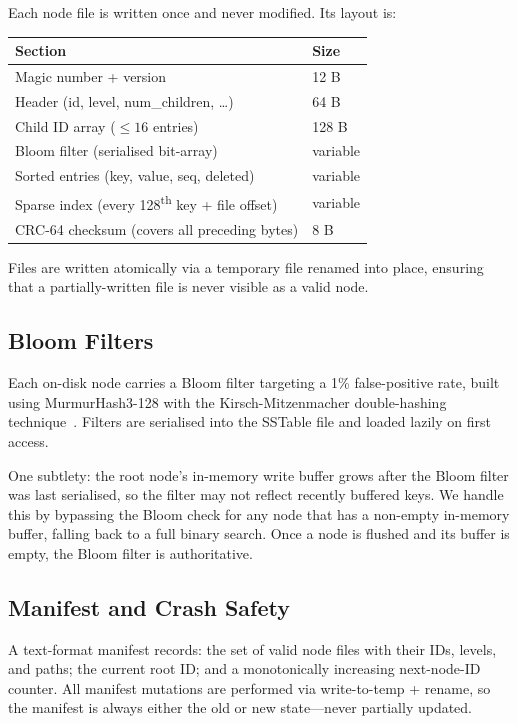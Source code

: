 \documentclass[10pt,twocolumn]{article}
\begin{document}
Each node file is written once and never modified.  Its layout is:

\begin{center}
\small
\begin{tabular}{ll}
\toprule
Section & Size \\
\midrule
Magic number + version & 12 B \\
Header (id, level, num\_children, \ldots) & 64 B \\
Child ID array ($\leq 16$ entries) & 128 B \\
Bloom filter (serialised bit-array) & variable \\
Sorted entries (key, value, seq, deleted) & variable \\
Sparse index (every 128\textsuperscript{th} key + file offset) & variable \\
CRC-64 checksum (covers all preceding bytes) & 8 B \\
\bottomrule
\end{tabular}
\end{center}

Files are written atomically via a temporary file renamed into place, ensuring
that a partially-written file is never visible as a valid node.

\subsection{Bloom Filters}

Each on-disk node carries a Bloom filter targeting a 1\% false-positive rate,
built using MurmurHash3-128 with the Kirsch-Mitzenmacher double-hashing
technique~\cite{bloom}.  Filters are serialised into the SSTable file and
loaded lazily on first access.

One subtlety: the root node's in-memory write buffer grows after the Bloom
filter was last serialised, so the filter may not reflect recently buffered
keys.  We handle this by bypassing the Bloom check for any node that has a
non-empty in-memory buffer, falling back to a full binary search.  Once a node
is flushed and its buffer is empty, the Bloom filter is authoritative.

\subsection{Manifest and Crash Safety}

A text-format manifest records: the set of valid node files with their IDs,
levels, and paths; the current root ID; and a monotonically increasing
next-node-ID counter.  All manifest mutations are performed via write-to-temp
+ rename, so the manifest is always either the old or new state---never
partially updated.
\end{document}
